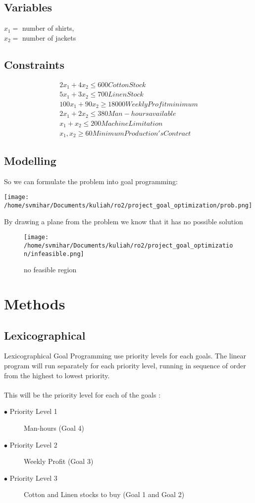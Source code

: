 \documentclass[twoside,twocolumn]{article}
\begin{document}
\subsection{Variables}
$x_1 = $ number of shirts, \\
$x_2 = $ number of jackets\\

\subsection{Constraints}
\begin{align}
2x_1 + 4x_2 \leq 600 Cotton  Stock \\
5x_1 + 3x_2 \leq 700 Linen Stock \\
100x_1 + 90x_2 \geq 18000 Weekly Profit minimum \\
2x_1 + 2x_2 \leq 380 Man-hours available \\
x_1 + x_2 \leq 200 Machine Limitation \\
x_1,x_2 \geq 60 Minimum Production's Contract 
\end{align}

\subsection{Modelling}
So we can formulate the problem into goal programming: 
\begin{center}
   \texttt{[image: /home/svmihar/Documents/kuliah/ro2/project\_goal\_optimization/prob.png]}
\end{center}

By drawing a plane from the problem we know that it has no possible solution 
\begin{figure}[h]
  \texttt{[image: /home/svmihar/Documents/kuliah/ro2/project\_goal\_optimization/infeasible.png]}
  \caption{no feasible region}
  \label{fig:boat1}
\end{figure}


\section{Methods}

\subsection{Lexicographical}

Lexicographical Goal Programming use priority levels for each goals. The linear program will run separately for each priority level, running in sequence of order from the highest to lowest priority. \\
\\
This will be the priority level for each of the goals :
\begin{description}
  \item[$\bullet$ Priority Level 1] Man-hours (Goal 4)
  \item[$\bullet$ Priority Level 2] Weekly Profit (Goal 3)
  \item[$\bullet$ Priority Level 3] Cotton and Linen stocks to buy (Goal 1 and Goal 2)
\end{description}
\end{document}
